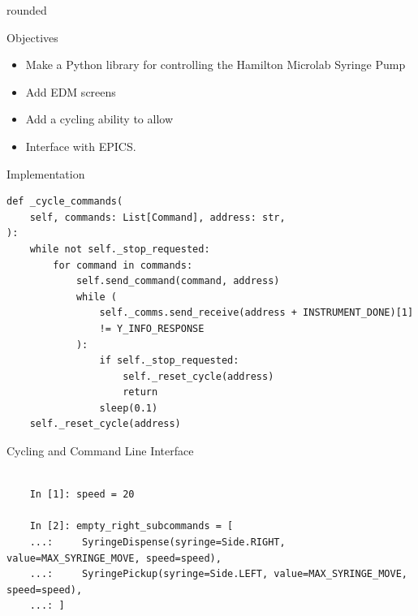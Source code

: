 \documentclass[a0paper,landscape]{baposter}
\begin{document}
\begin{poster}
\begin{posterbox}[column=0,headerfont={},headershape=rounded,boxheaderheight=0em,boxColorOne=white,borderColor=white,below=introduction]{rounded}
\begin{figure}[H]
\end{figure}
\end{posterbox}
\begin{posterbox}[name=objectives,column=1,row=0,span=2]{Objectives}
 \begin{itemize}
    \item Make a Python library for controlling the Hamilton Microlab Syringe Pump
    \item Add EDM screens
    \item Add a cycling ability to allow
    \item Interface with EPICS.
\end{itemize}
\end{posterbox}
\begin{posterbox}[name=implementation,column=1,span=2,below=objectives]{Implementation}
\begin{verbatim}
def _cycle_commands(
    self, commands: List[Command], address: str,
):
    while not self._stop_requested:
        for command in commands:
            self.send_command(command, address)
            while (
                self._comms.send_receive(address + INSTRUMENT_DONE)[1]
                != Y_INFO_RESPONSE
            ):
                if self._stop_requested:
                    self._reset_cycle(address)
                    return
                sleep(0.1)
    self._reset_cycle(address)
\end{verbatim}
\end{posterbox}
\begin{posterbox}[name=cycling,column=1,span=2,below=implementation]{Cycling and Command Line Interface}
    \begin{verbatim}
        
    In [1]: speed = 20

    In [2]: empty_right_subcommands = [
    ...:     SyringeDispense(syringe=Side.RIGHT, value=MAX_SYRINGE_MOVE, speed=speed),
    ...:     SyringePickup(syringe=Side.LEFT, value=MAX_SYRINGE_MOVE, speed=speed),
    ...: ]


\end{verbatim}
\end{posterbox}
\end{poster}
\end{document}
